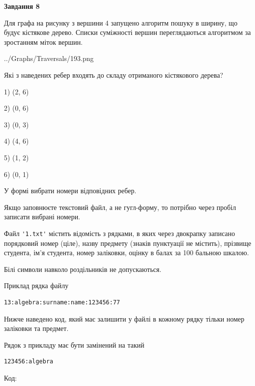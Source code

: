 \documentclass[12pt, ukrainian]{article}
\def\code#1{\Verb!#1!}
\begin{document}
{\begin {large}
{\begin {center}\textbf{Завдання 8}\end {center}}\par
Для графа на рисунку з вершини 4 запущено алгоритм пошуку в ширину, що будує кістякове дерево. Списки суміжності вершин переглядаються алгоритмом за зростанням міток вершин.\par
\begin{center}
	{../Graphs/Traversals/193.png}
\end{center}
\par Які з наведених ребер входять до складу отриманого кістякового дерева?\par
1) (2, 6)\par
2) (0, 6)\par
3) (0, 3)\par
4) (4, 6)\par
5) (1, 2)\par
6) (0, 1)\par
{\vskip 15pt} У формі вибрати номери відповідних ребер.


Якщо заповнюєте текстовий файл, а не гугл-форму, то потрібно через пробіл записа\-ти вибрані номери.\par
\newpage


Файл \code{'1.txt'} містить відомість з рядками, в яких через двокрапку записано поряд\-ковий номер (ціле), назву предмету (знаків пунктуації не містить), прізвище студента, ім'я студента, номер заліковки, оцінку в балах за 100 бальною шкалою.

Білі символи навколо роздільників не допускаються.

Приклад рядка файлу



\begin{verbatim}
13:algebra:surname:name:123456:77
\end{verbatim}


Нижче наведено код, який має залишити у файлі в кожному рядку тільки номер заліковки та предмет.

Рядок з прикладу має бути замінений на такий



\begin{verbatim}
123456:algebra
\end{verbatim}




Код:




\end{large}}
\end{document}
